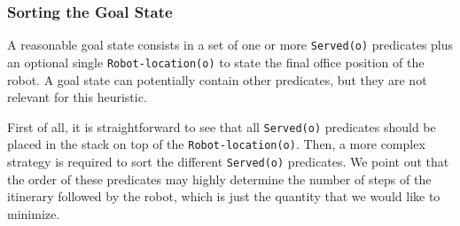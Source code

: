 \documentclass[12pt,a4paper,oneside]{article}
\numberwithin{equation}{section}
\numberwithin{equation}{section}
\theoremstyle{definition}
\begin{document}
\subsubsection{Sorting the Goal State}

A reasonable goal state consists in a set of one or more \texttt{Served(o)} predicates plus an optional single \texttt{Robot-location(o)} to state the final office position of the robot. A goal state can potentially contain other predicates, but they are not relevant for this heuristic.


First of all, it is straightforward to see that all \texttt{Served(o)} predicates should be placed in the stack on top of the \texttt{Robot-location(o)}. Then, a more complex strategy is required to sort the different \texttt{Served(o)} predicates. We point out that the order of these predicates may highly determine the number of steps of the itinerary followed by the robot, which is just the quantity that we would like to minimize. 
\end{document}
